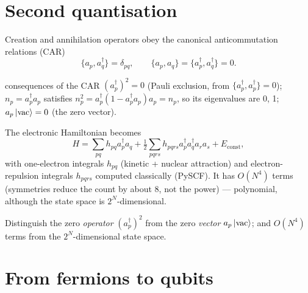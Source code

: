 \documentclass[11pt,a4paper,openany]{book}
\begin{document}
\section{Second quantisation}
Creation and annihilation operators obey the canonical anticommutation relations (CAR)
\[ \{a_p, a_q^\dagger\} = \delta_{pq}, \qquad \{a_p, a_q\} = \{a_p^\dagger, a_q^\dagger\} = 0 . \]
\begin{keyres}{consequences of the CAR}
$(a_p^\dagger)^2 = 0$ (Pauli exclusion, from $\{a_p^\dagger, a_p^\dagger\} = 0$); $n_p = a_p^\dagger a_p$ satisfies $n_p^2 = a_p^\dagger(1 - a_p^\dagger a_p)a_p = n_p$, so its eigenvalues are 0, 1;
$a_p\ket{\mathrm{vac}} = 0$ (the zero vector).
\end{keyres}
The electronic Hamiltonian becomes
\[ H = \sum_{pq}h_{pq}a_p^\dagger a_q + \tfrac12\sum_{pqrs}h_{pqrs}a_p^\dagger a_q^\dagger a_ra_s + E_{\mathrm{const}}, \]
with one-electron integrals $h_{pq}$ (kinetic + nuclear attraction) and electron-repulsion integrals $h_{pqrs}$ computed classically (PySCF).
It has $O(N^4)$ terms (symmetries reduce the count by about 8, not the power) --- polynomial, although the state space is $2^N$-dimensional.
\begin{trap}
Distinguish the zero \emph{operator} $(a_p^\dagger)^2$ from the zero \emph{vector} $a_p\ket{\mathrm{vac}}$; and $O(N^4)$ terms from the $2^N$-dimensional state space.
\end{trap}

\section{From fermions to qubits}
\end{document}
